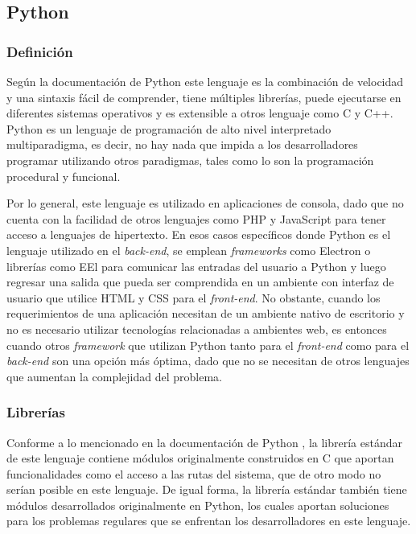 \subsection{Python}
\subsubsection{Definición}
Según la documentación de Python \parencite{Pythondoc} este lenguaje es la combinación de velocidad y una sintaxis fácil de comprender, tiene múltiples librerías, puede ejecutarse en diferentes sistemas operativos y es extensible a otros lenguaje como C y C++. Python \parencite{Python3} es un lenguaje de programación de alto nivel interpretado multiparadigma, es decir, no hay nada que impida a los desarrolladores programar utilizando otros paradigmas, tales como lo son la programación procedural y funcional.

Por lo general, este lenguaje es utilizado en aplicaciones de consola, dado que no cuenta con la facilidad de otros lenguajes como PHP y JavaScript para tener acceso a lenguajes de hipertexto. En esos casos específicos donde Python es el lenguaje utilizado en el \textit{back-end}, se emplean \textit{frameworks} como Electron o librerías como EEl para comunicar las entradas del usuario a Python y luego regresar una salida que pueda ser comprendida en un ambiente con interfaz de usuario que utilice HTML y CSS para el \textit{front-end}. No obstante, cuando los requerimientos de una aplicación necesitan de un ambiente nativo de escritorio y no es necesario utilizar tecnologías relacionadas a ambientes web, es entonces cuando otros \textit{framework} que utilizan Python tanto para el \textit{front-end} como para el \textit{back-end} son una opción más óptima, dado que no se necesitan de otros lenguajes que aumentan la complejidad del problema. 

\subsubsection{Librerías}
Conforme a lo mencionado en la documentación de Python \parencite{Pythondoc}, la librería estándar de este lenguaje contiene módulos originalmente construidos en C que aportan funcionalidades como el acceso a las rutas del sistema, que de otro modo no serían posible en este lenguaje. De igual forma, la librería estándar también tiene módulos desarrollados originalmente en Python, los cuales aportan soluciones para los problemas regulares que se enfrentan los desarrolladores en este lenguaje.

